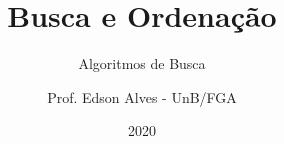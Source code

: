 \title{Busca e Ordenação}
\subtitle{Algoritmos de Busca}
\author{Prof. Edson Alves - UnB/FGA}
\date{2020}
